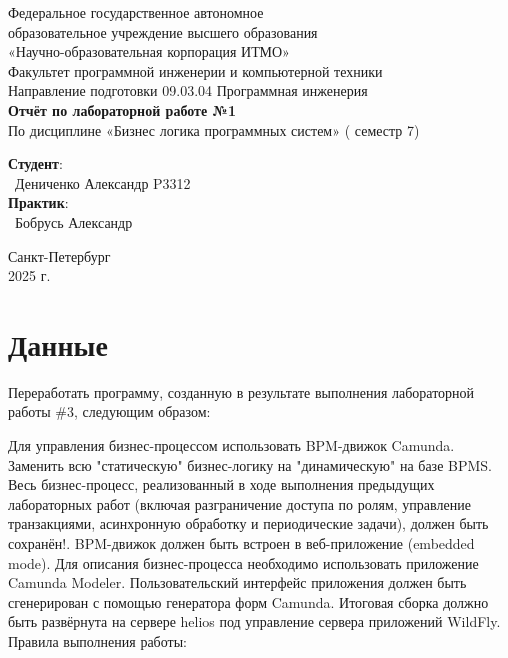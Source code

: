 \documentclass{article}
\begin{document}
\begin{center}
    \Large
    Федеральное государственное автономное \\
    образовательное учреждение высшего образования \\ 
    «Научно-образовательная корпорация ИТМО»\\
    \vspace{0.5cm}
    \large
    Факультет программной инженерии и компьютерной техники \\
    Направление подготовки 09.03.04 Программная инженерия \\
    \vspace{1cm}
    \Large
    \textbf{Отчёт по лабораторной работе №1} \\
        По дисциплине «Бизнес логика программных систем» ( семестр 7)\\
    \large
    \vspace{8cm}

    \begin{minipage}{.33\textwidth}
    \end{minipage}
    \hfill
    \begin{minipage}{.4\textwidth}
    
        \textbf{Студент}: \vspace{.1cm} \\
        \ Дениченко Александр P3312\\
        \textbf{Практик}:  \\
        \ Бобрусь Александр
    \end{minipage}
    \vfill
Санкт-Петербург\\ 2025 г.
\end{center}
\pagestyle{empty}
\newpage
\pagestyle{plain}

\section*{Данные}


Переработать программу, созданную в результате выполнения лабораторной работы \#3, следующим образом:

Для управления бизнес-процессом использовать BPM-движок Camunda.
Заменить всю "статическую" бизнес-логику на "динамическую" на базе BPMS. Весь бизнес-процесс, реализованный в ходе выполнения предыдущих лабораторных работ (включая разграничение доступа по ролям, управление транзакциями, асинхронную обработку и периодические задачи), должен быть сохранён!.
BPM-движок должен быть встроен в веб-приложение (embedded mode).
Для описания бизнес-процесса необходимо использовать приложение Camunda Modeler.
Пользовательский интерфейс приложения должен быть сгенерирован с помощью генератора форм Camunda.
Итоговая сборка должно быть развёрнута на сервере helios под управление сервера приложений WildFly.
Правила выполнения работы:
\end{document}
